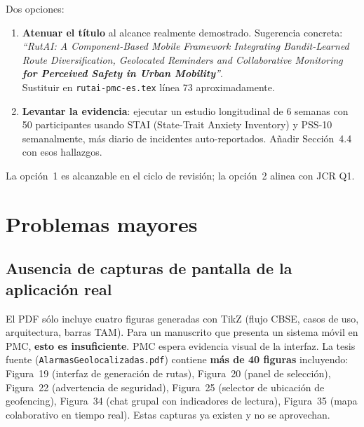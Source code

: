 \documentclass[11pt,a4paper]{article}
\begin{document}
\begin{abordaje}
Dos opciones:

\begin{enumerate}
  \item \textbf{Atenuar el t\'itulo} al alcance realmente demostrado. Sugerencia concreta:\\
  \emph{``RutAI: A Component-Based Mobile Framework Integrating Bandit-Learned Route Diversification, Geolocated Reminders and Collaborative Monitoring \textbf{for Perceived Safety in Urban Mobility}''}.\\
  Sustituir en \texttt{rutai-pmc-es.tex} l\'inea 73 aproximadamente.
  \item \textbf{Levantar la evidencia}: ejecutar un estudio longitudinal de 6 semanas con 50 participantes usando STAI (State-Trait Anxiety Inventory) y PSS-10 semanalmente, m\'as diario de incidentes auto-reportados. A\~nadir Secci\'on~4.4 con esos hallazgos.
\end{enumerate}

La opci\'on~1 es alcanzable en el ciclo de revisi\'on; la opci\'on~2 alinea con JCR Q1.
\end{abordaje}

\section{Problemas mayores}

\subsection{Ausencia de capturas de pantalla de la aplicaci\'on real}

\begin{deficiencia}[M.1 --- Deficiencia]
El PDF s\'olo incluye cuatro figuras generadas con TikZ (flujo CBSE, casos de uso, arquitectura, barras TAM). Para un manuscrito que presenta un sistema m\'ovil en PMC, \textbf{esto es insuficiente}. PMC espera evidencia visual de la interfaz. La tesis fuente (\texttt{AlarmasGeolocalizadas.pdf}) contiene \textbf{m\'as de 40 figuras} incluyendo: Figura~19 (interfaz de generaci\'on de rutas), Figura~20 (panel de selecci\'on), Figura~22 (advertencia de seguridad), Figura~25 (selector de ubicaci\'on de geofencing), Figura~34 (chat grupal con indicadores de lectura), Figura~35 (mapa colaborativo en tiempo real). Estas capturas ya existen y no se aprovechan.
\end{deficiencia}
\end{document}
